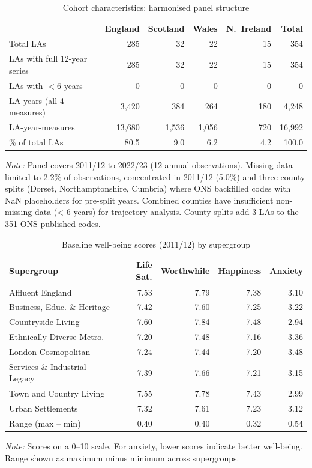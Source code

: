 \documentclass[12pt,a4paper]{article}
\begin{document}
\begin{table}[H]
\centering
\caption{Cohort characteristics: harmonised panel structure}
\label{tab:cohort}
\small
\begin{tabular}{lrrrrr}
\toprule
& England & Scotland & Wales & N.\ Ireland & Total \\
\midrule
Total LAs & 285 & 32 & 22 & 15 & 354 \\
LAs with full 12-year series & 285 & 32 & 22 & 15 & 354 \\
LAs with $<$6 years & 0 & 0 & 0 & 0 & 0 \\
\midrule
LA-years (all 4 measures) & 3,420 & 384 & 264 & 180 & 4,248 \\
LA-year-measures & 13,680 & 1,536 & 1,056 & 720 & 16,992 \\
\midrule
\% of total LAs & 80.5 & 9.0 & 6.2 & 4.2 & 100.0 \\
\bottomrule
\end{tabular}
\begin{flushleft}
\small\textit{Note:} Panel covers 2011/12 to 2022/23 (12 annual observations). Missing data limited to 2.2\% of observations, concentrated in 2011/12 (5.0\%) and three county splits (Dorset, Northamptonshire, Cumbria) where ONS backfilled codes with NaN placeholders for pre-split years. Combined counties have insufficient non-missing data (< 6 years) for trajectory analysis. County splits add 3 LAs to the 351 ONS published codes.
\end{flushleft}
\end{table}

\begin{table}[H]
\centering
\caption{Baseline well-being scores (2011/12) by supergroup}
\label{tab:baseline}
\small
\begin{tabular}{l*{4}{r}}
\toprule
Supergroup & Life Sat. & Worthwhile & Happiness & Anxiety \\
\midrule
Affluent England & 7.53 & 7.79 & 7.38 & 3.10 \\
Business, Educ. \& Heritage & 7.42 & 7.60 & 7.25 & 3.22 \\
Countryside Living & 7.60 & 7.84 & 7.48 & 2.94 \\
Ethnically Diverse Metro. & 7.20 & 7.48 & 7.16 & 3.36 \\
London Cosmopolitan & 7.24 & 7.44 & 7.20 & 3.48 \\
Services \& Industrial Legacy & 7.39 & 7.66 & 7.21 & 3.15 \\
Town and Country Living & 7.55 & 7.78 & 7.43 & 2.99 \\
Urban Settlements & 7.32 & 7.61 & 7.23 & 3.12 \\
\midrule
Range (max -- min) & 0.40 & 0.40 & 0.32 & 0.54 \\
\bottomrule
\end{tabular}
\begin{flushleft}
\small\textit{Note:} Scores on a 0--10 scale. For anxiety, lower scores indicate better well-being. Range shown as maximum minus minimum across supergroups.
\end{flushleft}
\end{table}
\end{document}
